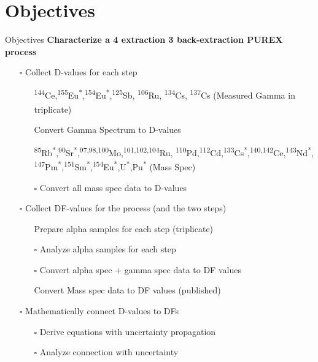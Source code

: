 \documentclass{beamer}
\newcommand{\tss}{\textsuperscript}
\newcommand{\cmark}{\ding{51}}%
\newcommand{\done}{\rlap{$\square$}{\raisebox{2pt}{\large\hspace{1pt}\cmark}}%
  \hspace{-2.5pt}}
\newcommand{\notdone}{$\square$}
\begin{document}
\section{Objectives}
\begin{frame}[allowframebreaks]{Objectives}
\vspace{-0.7cm}
\textbf{\small Characterize a 4 extraction 3 back-extraction PUREX process}
\begin{itemize}
\item[\notdone]{Collect D-values for each step}
  \begin{itemize}
  \item[\tiny\done]{\tiny \tss{144}Ce,\tss{155}Eu\tss{*},\tss{154}Eu\tss{*},\tss{125}Sb,
    \tss{106}Ru, \tss{134}Cs, \tss{137}Cs
    (Measured Gamma in triplicate)\tss{\cite{chirayath2015trace}}}
  \item[\tiny\done]{\tiny Convert Gamma Spectrum to D-values}
  \item[\tiny\done]{\tiny \tss{85}Rb\tss{*},\tss{90}Sr\tss{*},\tss{97,98,100}Mo,\tss{101,102,104}Ru,
    \tss{110}Pd,\tss{112}Cd,\tss{133}Cs\tss{*},\tss{140,142}Ce,\tss{143}Nd\tss{*},
    \tss{147}Pm\tss{*},\tss{151}Sm\tss{*},\tss{154}Eu\tss{*},U\tss{*},Pu\tss{*} (Mass Spec)}
  \item[\tiny\notdone]{\tiny Convert all mass spec data to D-values}
  \end{itemize}
\item[\notdone]{Collect DF-values for the process (and the two steps)}
  \begin{itemize}
  \item[\tiny\done]{\tiny Prepare alpha samples for each step (triplicate)}
  \item[\tiny\notdone]{\tiny Analyze alpha samples for each step}
  \item[\tiny\notdone]{\tiny Convert alpha spec + gamma spec data to DF values}
  \item[\tiny\done]{\tiny Convert Mass spec data to DF values (published)}
  \end{itemize}
\item[\notdone]{Mathematically connect D-values to DFs}
  \begin{itemize}
  \item[\tiny\notdone]{\tiny Derive equations with uncertainty propagation}
  \item[\tiny\notdone]{\tiny Analyze connection with uncertainty}
  \end{itemize}
\end{itemize}
\framebreak

\end{frame}
\end{document}
